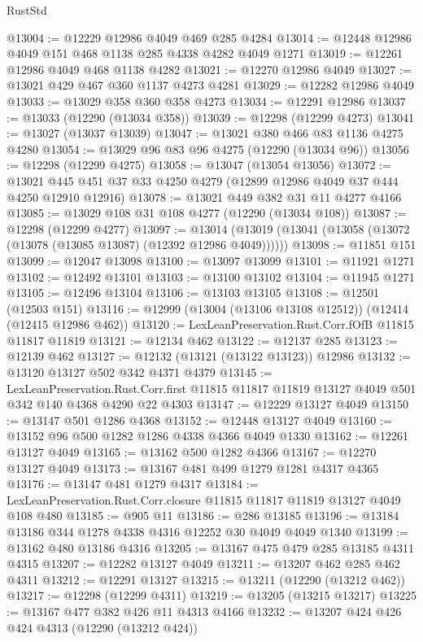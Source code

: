 \begin{lexlean}{RustStd}
\begin{coremodule}
@13004 := @12229 @12986 @4049 @469 @285 @4284
@13014 := @12448 @12986 @4049 @151 @468 @1138 @285 @4338 @4282 @4049 @1271
@13019 := @12261 @12986 @4049 @468 @1138 @4282
@13021 := @12270 @12986 @4049
@13027 := @13021 @429 @467 @360 @1137 @4273 @4281
@13029 := @12282 @12986 @4049
@13033 := @13029 @358 @360 @358 @4273
@13034 := @12291 @12986
@13037 := @13033 (@12290 (@13034 @358))
@13039 := @12298 (@12299 @4273)
@13041 := @13027 (@13037 @13039)
@13047 := @13021 @380 @466 @83 @1136 @4275 @4280
@13054 := @13029 @96 @83 @96 @4275 (@12290 (@13034 @96))
@13056 := @12298 (@12299 @4275)
@13058 := @13047 (@13054 @13056)
@13072 := @13021 @445 @451 @37 @33 @4250 @4279 (@12899 @12986 @4049 @37 @444 @4250 @12910 @12916)
@13078 := @13021 @449 @382 @31 @11 @4277 @4166
@13085 := @13029 @108 @31 @108 @4277 (@12290 (@13034 @108))
@13087 := @12298 (@12299 @4277)
@13097 := @13014 (@13019 (@13041 (@13058 (@13072 (@13078 (@13085 @13087) (@12392 @12986 @4049))))))
@13098 := @11851 @151
@13099 := @12047 @13098
@13100 := @13097 @13099
@13101 := @11921 @1271
@13102 := @12492 @13101
@13103 := @13100 @13102
@13104 := @11945 @1271
@13105 := @12496 @13104
@13106 := @13103 @13105
@13108 := @12501 (@12503 @151)
@13116 := @12999 (@13004 (@13106 @13108 @12512)) (@12414 (@12415 @12986 @462))
@13120 := LexLeanPreservation.Rust.Corr.fOfB @11815 @11817 @11819
@13121 := @12134 @462
@13122 := @12137 @285
@13123 := @12139 @462
@13127 := @12132 (@13121 (@13122 @13123)) @12986
@13132 := @13120 @13127 @502 @342 @4371 @4379
@13145 := LexLeanPreservation.Rust.Corr.first
    @11815
    @11817
    @11819
    @13127
    @4049
    @501
    @342
    @140
    @4368
    @4290
    @22
    @4303
@13147 := @12229 @13127 @4049
@13150 := @13147 @501 @1286 @4368
@13152 := @12448 @13127 @4049
@13160 := @13152 @96 @500 @1282 @1286 @4338 @4366 @4049 @1330
@13162 := @12261 @13127 @4049
@13165 := @13162 @500 @1282 @4366
@13167 := @12270 @13127 @4049
@13173 := @13167 @481 @499 @1279 @1281 @4317 @4365
@13176 := @13147 @481 @1279 @4317
@13184 := LexLeanPreservation.Rust.Corr.closure @11815 @11817 @11819 @13127 @4049 @108 @480
@13185 := @905 @11
@13186 := @286 @13185
@13196 := @13184 @13186 @344 @1278 @4338 @4316 @12252 @30 @4049 @4049 @1340
@13199 := @13162 @480 @13186 @4316
@13205 := @13167 @475 @479 @285 @13185 @4311 @4315
@13207 := @12282 @13127 @4049
@13211 := @13207 @462 @285 @462 @4311
@13212 := @12291 @13127
@13215 := @13211 (@12290 (@13212 @462))
@13217 := @12298 (@12299 @4311)
@13219 := @13205 (@13215 @13217)
@13225 := @13167 @477 @382 @426 @11 @4313 @4166
@13232 := @13207 @424 @426 @424 @4313 (@12290 (@13212 @424))

\end{coremodule}
\end{lexlean}
